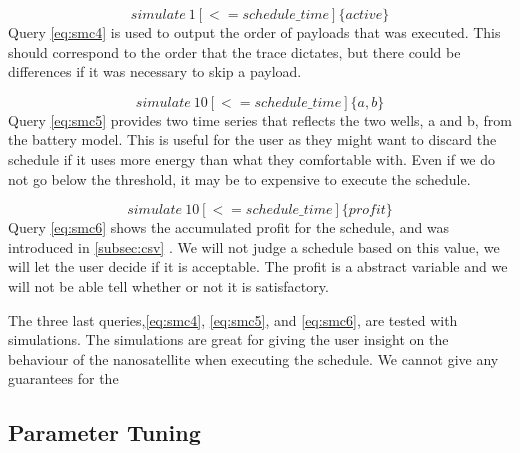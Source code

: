 \begin{equation} \label{eq:smc4}
	simulate\ 1 [<=schedule\_time] \{ active\}
\end{equation}
Query \ref{eq:smc4} is used to output the order of payloads that was executed. This should correspond to the order that the trace dictates, but there could be differences if it was necessary to skip a payload.

\begin{equation} \label{eq:smc5}
	simulate\ 10 [<=schedule\_time] \{ a, b\}
\end{equation}
Query \ref{eq:smc5} provides two time series that reflects the two wells, a and b, from the battery model. This is useful for the user as they might want to discard the schedule if it uses more energy than what they comfortable with. Even if we do not go below the threshold, it may be to expensive to execute the schedule. %

\begin{equation} \label{eq:smc6}
	simulate\ 10 [<= schedule\_time] \{ profit \}
\end{equation}
Query \ref{eq:smc6} shows the accumulated profit for the schedule, and was introduced in \cref{subsec:csv} . We will not judge a schedule based on this value, we will let the user decide if it is acceptable. The profit is a abstract variable and we will not be able tell whether or not it is satisfactory.


The three last queries,\ref{eq:smc4}, \ref{eq:smc5}, and \ref{eq:smc6}, are tested with simulations. The simulations are great for giving the user insight on the behaviour of the nanosatellite when executing the schedule. 
We cannot give any guarantees for the

\subsection{Parameter Tuning}